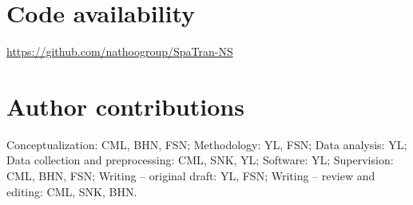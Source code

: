 \documentclass[pdflatex,sn-mathphys-num]{sn-jnl}%
\theoremstyle{thmstyleone}%
\theoremstyle{thmstyletwo}%
\theoremstyle{thmstylethree}%
\begin{document}
\section*{Code availability}

\url{https://github.com/nathoogroup/SpaTran-NS}



\section*{Author contributions}
Conceptualization: CML, BHN, FSN;
Methodology: YL, FSN;
Data analysis: YL;
Data collection and preprocessing: CML, SNK, YL;
Software: YL;
Supervision: CML, BHN, FSN;
Writing – original draft: YL, FSN;
Writing – review and editing: CML, SNK, BHN.
\end{document}
